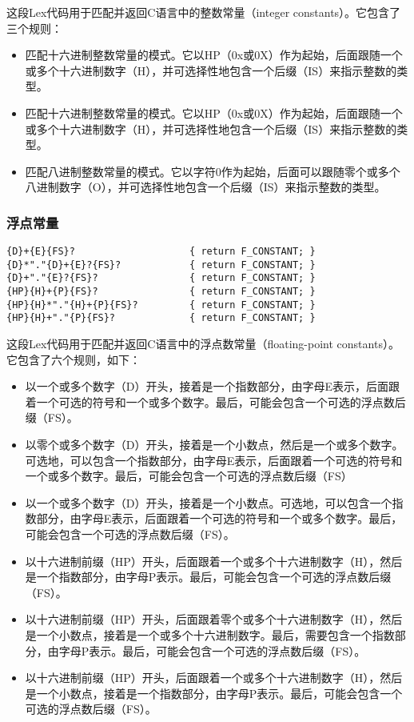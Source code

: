 \documentclass[lang=cn,11pt,a4paper]{elegantpaper}
\begin{document}
这段Lex代码用于匹配并返回C语言中的整数常量（integer constants）。它包含了三个规则：
\begin{itemize}
    \item 匹配十六进制整数常量的模式。它以HP（0x或0X）作为起始，后面跟随一个或多个十六进制数字（H），并可选择性地包含一个后缀（IS）来指示整数的类型。
    \item 匹配十六进制整数常量的模式。它以HP（0x或0X）作为起始，后面跟随一个或多个十六进制数字（H），并可选择性地包含一个后缀（IS）来指示整数的类型。
    \item 匹配八进制整数常量的模式。它以字符0作为起始，后面可以跟随零个或多个八进制数字（O），并可选择性地包含一个后缀（IS）来指示整数的类型。
\end{itemize}

\subsubsection{浮点常量}

\begin{lstlisting}
{D}+{E}{FS}?		    		{ return F_CONSTANT; }
{D}*"."{D}+{E}?{FS}?			{ return F_CONSTANT; }
{D}+"."{E}?{FS}?		    	{ return F_CONSTANT; }
{HP}{H}+{P}{FS}?		    	{ return F_CONSTANT; }
{HP}{H}*"."{H}+{P}{FS}?			{ return F_CONSTANT; }
{HP}{H}+"."{P}{FS}?		    	{ return F_CONSTANT; }
\end{lstlisting}

这段Lex代码用于匹配并返回C语言中的浮点数常量（floating-point constants）。它包含了六个规则，如下：

\begin{itemize}
    \item 以一个或多个数字（D）开头，接着是一个指数部分，由字母E表示，后面跟着一个可选的符号和一个或多个数字。最后，可能会包含一个可选的浮点数后缀（FS）。
    \item 以零个或多个数字（D）开头，接着是一个小数点，然后是一个或多个数字。可选地，可以包含一个指数部分，由字母E表示，后面跟着一个可选的符号和一个或多个数字。最后，可能会包含一个可选的浮点数后缀（FS）
    \item 以一个或多个数字（D）开头，接着是一个小数点。可选地，可以包含一个指数部分，由字母E表示，后面跟着一个可选的符号和一个或多个数字。最后，可能会包含一个可选的浮点数后缀（FS）。
    \item 以十六进制前缀（HP）开头，后面跟着一个或多个十六进制数字（H），然后是一个指数部分，由字母P表示。最后，可能会包含一个可选的浮点数后缀（FS）。
    \item 以十六进制前缀（HP）开头，后面跟着零个或多个十六进制数字（H），然后是一个小数点，接着是一个或多个十六进制数字。最后，需要包含一个指数部分，由字母P表示。最后，可能会包含一个可选的浮点数后缀（FS）。
    \item 以十六进制前缀（HP）开头，后面跟着一个或多个十六进制数字（H），然后是一个小数点，接着是一个指数部分，由字母P表示。最后，可能会包含一个可选的浮点数后缀（FS）。
\end{itemize}
\end{document}
